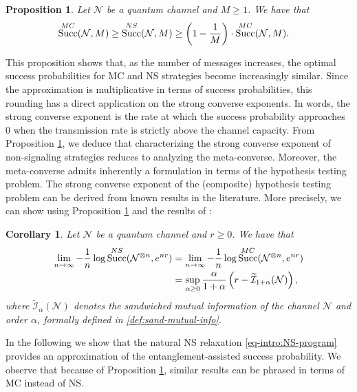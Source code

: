\documentclass[a4paper,onecolumn,11pt,accepted=2025-10-01]{quantumarticle}
\newtheorem{prop}[theorem]{Proposition}
\newtheorem{cor}[theorem]{Corollary}
\DeclareMathOperator{\suc}{Succ}
\newcommand*{\cI}{\mathcal{I}}
\newcommand*{\cN}{\mathcal{N}}
\begin{document}
\begin{prop}\label{prop-intro:MC-NS}
    Let $\cN$ be a quantum channel and $M\ge 1$. We have that 
    \begin{align}
        \suc^{\rm{MC}}(\cN,M)&\ge  \suc^{\rm{NS}}(\cN,M) 
        \ge \left(1-\frac{1}{M}\right)\cdot   \suc^{\rm{MC}}(\cN,M).
    \end{align}
\end{prop}

This proposition shows that, as the number of messages increases, the optimal success probabilities for MC and NS strategies become increasingly similar. Since the approximation is multiplicative in terms of success probabilities, this rounding has a direct application on the strong converse exponents. In words, the strong converse exponent is the rate at which the success probability approaches $0$ when the transmission rate is strictly above the channel capacity. From Proposition \ref{prop-intro:MC-NS}, we deduce that  characterizing  the strong converse exponent of non-signaling strategies reduces to analyzing the meta-converse. Moreover, the meta-converse admits inherently a formulation in terms of the hypothesis testing problem. The strong converse exponent of the (composite) hypothesis testing problem can be derived from known results in the literature. More precisely, we can show using Proposition \ref{prop-intro:MC-NS} and  the results of \cite{Gupta2015Mar,Hayashi2016Oct}:

\begin{cor}\label{cor-intro:SCE-MC-NS}
   Let  $\cN$ be a  quantum channel and $r\ge 0$. We have that
    \begin{align}\label{intro:NS-exponent}
        \lim_{n\rightarrow \infty} -\frac{1}{n}\log\suc^{\rm{NS}}(\cN^{\otimes n},e^{nr}) 
        &=  \lim_{n\rightarrow \infty} -\frac{1}{n}\log\suc^{\rm{MC}}(\cN^{\otimes n},e^{nr})
        \\&= \sup_{\alpha\ge 0}  \frac{\alpha}{1+\alpha}\left( r- \widetilde{\cI}_{1+\alpha}(\cN)\right),
    \end{align}
    where $\widetilde{\cI}_{\alpha}(\cN)$ denotes the sandwiched mutual information of the channel $\cN$ and order $\alpha$, formally defined in \eqref{def:sand-mutual-info}. 
\end{cor}

In the following we show that the natural  NS relaxation \eqref{eq-intro:NS-program} provides an approximation of the entanglement-assisted success probability. We observe that because of Proposition \ref{prop-intro:MC-NS}, similar results can be phrased in terms of MC instead of NS.
\end{document}
